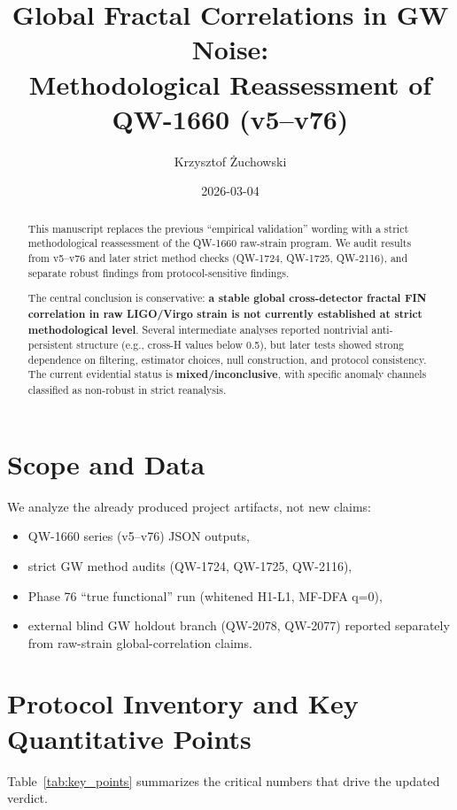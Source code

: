 \documentclass[11pt,a4paper]{article}
\title{\textbf{Global Fractal Correlations in GW Noise:\\
Methodological Reassessment of QW-1660 (v5--v76)}}
\author[1]{Krzysztof Żuchowski}
\affil[1]{Independent Researcher, Fractal Information Theory Project}
\affil[ ]{\texttt{krzysztof.zuch@gmail.com}}
\date{2026-03-04}
\begin{document}
\maketitle

\begin{abstract}
This manuscript replaces the previous ``empirical validation'' wording with a strict methodological reassessment of the QW-1660 raw-strain program. We audit results from v5--v76 and later strict method checks (QW-1724, QW-1725, QW-2116), and separate robust findings from protocol-sensitive findings.

The central conclusion is conservative: \textbf{a stable global cross-detector fractal FIN correlation in raw LIGO/Virgo strain is not currently established at strict methodological level}. Several intermediate analyses reported nontrivial anti-persistent structure (e.g., cross-H values below 0.5), but later tests showed strong dependence on filtering, estimator choices, null construction, and protocol consistency. The current evidential status is \textbf{mixed/inconclusive}, with specific anomaly channels classified as non-robust in strict reanalysis.
\end{abstract}

\section{Scope and Data}
We analyze the already produced project artifacts, not new claims:
\begin{itemize}[leftmargin=1.5em]
    \item QW-1660 series (v5--v76) JSON outputs,
    \item strict GW method audits (QW-1724, QW-1725, QW-2116),
    \item Phase 76 ``true functional'' run (whitened H1-L1, MF-DFA q=0),
    \item external blind GW holdout branch (QW-2078, QW-2077) reported separately from raw-strain global-correlation claims.
\end{itemize}

\section{Protocol Inventory and Key Quantitative Points}
Table~\ref{tab:key_points} summarizes the critical numbers that drive the updated verdict.
\end{document}

